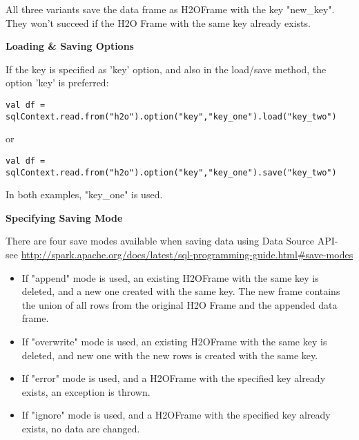 All three variants save the data frame as H2OFrame with the key "new\_key". They won't succeed if the H2O Frame with the same key already exists.

\textbf{Loading \& Saving Options}

If the key is specified as 'key' option, and also in the load/save method, the option 'key' is preferred:
\begin{lstlisting}[style=Scala]
val df = sqlContext.read.from("h2o").option("key","key_one").load("key_two")
\end{lstlisting}
or
\begin{lstlisting}[style=Scala]
val df = sqlContext.read.from("h2o").option("key","key_one").save("key_two")
\end{lstlisting}

In both examples, "key\_one" is used.

\textbf{Specifying Saving Mode}

There are four save modes available when saving data using Data Source API- see \url{http://spark.apache.org/docs/latest/sql-programming-guide.html#save-modes}

\begin{itemize}
\item If "append" mode is used, an existing H2OFrame with the same key is deleted, and a new one created with the same key. The new frame contains the union of all rows from the original H2O Frame and the appended data frame.
\item If "overwrite" mode is used, an existing H2OFrame with the same key is deleted, and new one with the new rows is created with the same key.
\item If "error" mode is used, and a H2OFrame with the specified key already exists, an exception is thrown.
\item If "ignore" mode is used, and a H2OFrame with the specified key already exists, no data are changed.
\end{itemize}

